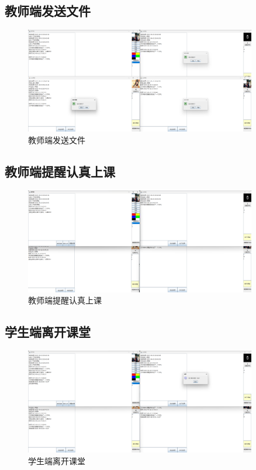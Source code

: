 \documentclass[UTF8,12pt]{article}
\begin{document}
\newpage

\subsection{教师端发送文件}
\begin{figure}[htbp]
    \centering
    \includegraphics[width=0.9\textwidth]{img/39.png}
    \caption{教师端发送文件}
\end{figure}

\subsection{教师端提醒认真上课}
\begin{figure}[htbp]
    \centering
    \includegraphics[width=0.9\textwidth]{img/38.png}
    \caption{教师端提醒认真上课}
\end{figure}

\subsection{学生端离开课堂}
\begin{figure}[htbp]
    \centering
    \includegraphics[width=0.9\textwidth]{img/40.png}
    \caption{学生端离开课堂}
\end{figure}
\end{document}

